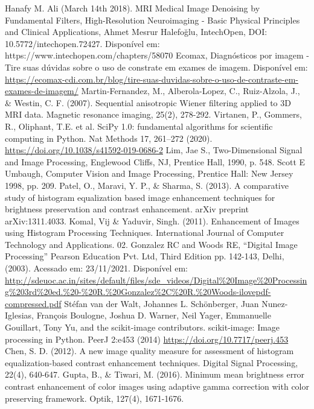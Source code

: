 \documentclass[conference]{IEEEtran}
\begin{document}
\begin{thebibliography}{00}
 Hanafy M. Ali (March 14th 2018). MRI Medical Image Denoising by Fundamental Filters, High-Resolution Neuroimaging - Basic Physical Principles and Clinical Applications, Ahmet Mesrur Halefoğlu, IntechOpen, DOI: 10.5772/intechopen.72427. Disponível em: https://www.intechopen.com/chapters/58070
 Ecomax, Diagnósticos por imagem - Tire suas dúvidas sobre o uso de constrate em exames de imagem. Disponível em: \url{https://ecomax-cdi.com.br/blog/tire-suas-duvidas-sobre-o-uso-de-contraste-em-exames-de-imagem/}
 Martin-Fernandez, M., Alberola-Lopez, C., Ruiz-Alzola, J., \& Westin, C. F. (2007). Sequential anisotropic Wiener filtering applied to 3D MRI data. Magnetic resonance imaging, 25(2), 278-292.
 Virtanen, P., Gommers, R., Oliphant, T.E. et al. SciPy 1.0: fundamental algorithms for scientific computing in Python. Nat Methods 17, 261–272 (2020). \url{https://doi.org/10.1038/s41592-019-0686-2}
 Lim, Jae S., Two-Dimensional Signal and Image Processing, Englewood Cliffs, NJ, Prentice Hall, 1990, p. 548.
 Scott E Umbaugh, Computer Vision and Image Processing, Prentice Hall: New Jersey 1998, pp. 209.
 Patel, O., Maravi, Y. P., \& Sharma, S. (2013). A comparative study of histogram equalization based image enhancement techniques for brightness preservation and contrast enhancement. arXiv preprint arXiv:1311.4033.
 Komal, Vij \& Yaduvir, Singh. (2011). Enhancement of Images using Histogram Processing Techniques. International Journal of Computer Technology and Applications. 02.
 Gonzalez RC and Woods RE, “Digital Image Processing” Pearson Education Pvt. Ltd, Third
Edition pp. 142-143, Delhi, (2003). Acessado em: 23/11/2021. Disponível em: \url{http://sdeuoc.ac.in/sites/default/files/sde_videos/Digital%20Image%20Processing%203rd%20ed.%20-%20R.%20Gonzalez%2C%20R.%20Woods-ilovepdf-compressed.pdf}
 Stéfan van der Walt, Johannes L. Schönberger, Juan Nunez-Iglesias, François Boulogne, Joshua D. Warner, Neil Yager, Emmanuelle Gouillart, Tony Yu, and the scikit-image contributors. scikit-image: Image processing in Python. PeerJ 2:e453 (2014) \url{https://doi.org/10.7717/peerj.453}
 Chen, S. D. (2012). A new image quality measure for assessment of histogram equalization-based contrast enhancement techniques. Digital Signal Processing, 22(4), 640-647.
 Gupta, B., \& Tiwari, M. (2016). Minimum mean brightness error contrast enhancement of color images using adaptive gamma correction with color preserving framework. Optik, 127(4), 1671-1676.
\end{thebibliography}
\vspace{12pt}
\end{document}
